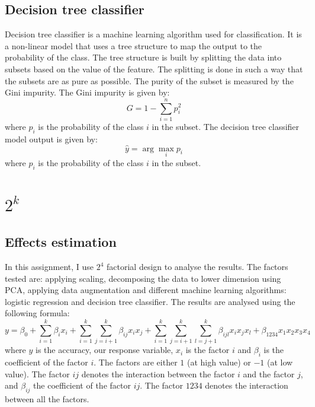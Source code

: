 \documentclass{article}
\begin{document}
\subsection{Decision tree classifier}
\label{subsec:decision_tree}
Decision tree classifier is a machine learning algorithm used for classification. It is a non-linear model that uses a tree structure to map the output to the probability of the class. The tree structure is built by splitting the data into subsets based on the value of the feature. The splitting is done in such a way that the subsets are as pure as possible. The purity of the subset is measured by the Gini impurity. The Gini impurity is given by:
\begin{equation}
    G = 1 - \sum_{i=1}^{n} p_i^2
\end{equation}
where $p_i$ is the probability of the class $i$ in the subset. The decision tree classifier model output is given by:
\begin{equation}
    \hat{y} = \arg\max_{i} p_i
\end{equation}
where $p_i$ is the probability of the class $i$ in the subset.

\section{\texorpdfstring{$2^k$} }
\label{sec:factorial_design}

\subsection{Effects estimation}
In this assignment, I use $2^4$ factorial design to analyse the results. The factors tested are: applying scaling, decomposing the data to lower dimension using PCA, applying data augmentation and different machine learning algorithms: logistic regression and decision tree classifier. The results are analysed using the following formula:
\begin{equation}
    y = \beta_0 + \sum_{i=1}^{k} \beta_i x_i + \sum_{i=1}^{k} \sum_{j=i+1}^{k} \beta_{ij} x_i x_j + \sum_{i=1}^{k} \sum_{j=i+1}^{k} \sum_{l=j+1}^{k} \beta_{ijl} x_i x_j x_l + \beta_{1234} x_1 x_2 x_3 x_4
\end{equation}
where $y$ is the accuracy, our response variable, $x_i$ is the factor $i$ and $\beta_i$ is the coefficient of the factor $i$. The factors are either $1$ (at high value) or $-1$ (at low value). The factor $ij$ denotes the interaction between the factor $i$ and the factor $j$, and $\beta_{ij}$ the coefficient of the factor $ij$. The factor $1234$ denotes the interaction between all the factors.
\end{document}
